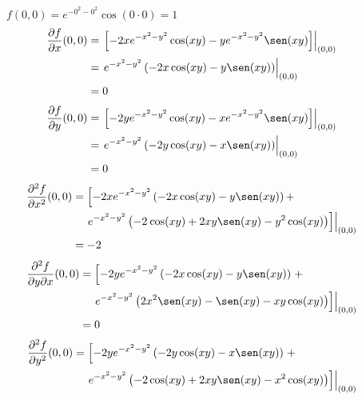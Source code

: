 \documentclass[fleqn, 12pt]{article}
\newcommand{\derivadaparcial}[2]{\dfrac{\partial {#1}}{\partial {#2}}}
\newcommand{\derivadaparcialn}[3]{\dfrac{\partial^{#3} {#1}}{\partial {#2}^{#3}}}
\newcommand{\derivadaparcialnd}[3]{\dfrac{\partial^{2} {#1}}{\partial {#3} \partial {#2}}}
\begin{document}
\begin{enumerate}
        $ f(0,0) = e^{-0^2 - 0^2} \cos (0 \cdot 0) = 1 $
        \begin{align*}
            \hspace{-1cm} \derivadaparcial{f}{x} (0,0) &= \left. \left[ -2x e^{-x^2 - y^2} \cos (xy) - y e^{-x^2 - y^2} \sen (xy) \right] \right|_{(0,0)} \\
            &= \left. e^{-x^2 - y^2} \left(-2x \cos (xy) - y \sen (xy) \right) \right|_{(0,0)} \\
            &= 0
        \end{align*}
        \begin{align*}
            \hspace{-1cm} \derivadaparcial{f}{y} (0,0) &= \left. \left[ -2y e^{-x^2 - y^2} \cos (xy) - x e^{-x^2 - y^2} \sen (xy) \right] \right|_{(0,0)} \\
            &= \left. e^{-x^2 - y^2} \left( -2y \cos (xy) - x \sen (xy) \right) \right|_{(0,0)} \\
            &= 0
        \end{align*}
        \begin{align*}
            \hspace{-1cm} \derivadaparcialn{f}{x}{2} (0,0) &= \left[ -2x e^{-x^2 - y^2} \left(-2x \cos (xy) - y \sen (xy) \right) + \right. \\
            & \quad \left. \left. e^{-x^2 - y^2} \left(-2^{} \cos (xy) + 2xy \sen (xy) - y^2 \cos (xy) \right) \right] \right|_{(0,0)} \\
            &= -2
        \end{align*}
        \begin{align*}
            \hspace{-1cm} \derivadaparcialnd{f}{x}{y} (0,0) &= \left[ -2y e^{-x^2 - y^2} \left(-2x \cos (xy) - y \sen (xy) \right) \right. +  \\
            & \quad \left. \left. e^{-x^2 - y^2} \left(2x^2 \sen (xy) - \sen (xy) - xy \cos (xy) \right) \right] \right|_{(0,0)} \\
            &= 0
        \end{align*}
        \begin{align*}
            \hspace{-1cm} \derivadaparcialn{f}{y}{2} (0,0) &= \left[ -2y e^{-x^2 - y^2} \left(-2y \cos (xy) - x \sen (xy) \right) \right. + \\
            & \quad \left. \left. e^{-x^2 - y^2} \left(-2 \cos (xy) + 2xy \sen (xy) - x^2 \cos (xy) \right) \right] \right|_{(0,0)} \\

\end{align*}
\end{enumerate}
\end{document}
